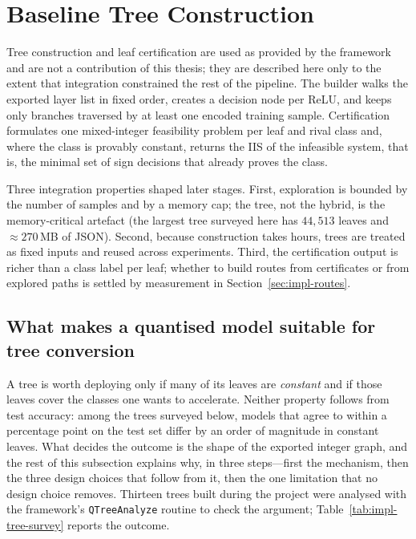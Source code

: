 \section{Baseline Tree Construction}
\label{sec:impl-tree}

Tree construction and leaf certification are used as provided by the framework and are not a contribution of this thesis; they are described here only to the extent that integration constrained the rest of the pipeline.
The builder walks the exported layer list in fixed order, creates a decision node per \ac{ReLU}, and keeps only branches traversed by at least one encoded training sample.
Certification formulates one mixed-integer feasibility problem per leaf and rival class and, where the class is provably constant, returns the \ac{IIS} of the infeasible system, that is, the minimal set of sign decisions that already proves the class.

Three integration properties shaped later stages.
First, exploration is bounded by the number of samples and by a memory cap; the tree, not the hybrid, is the memory-critical artefact (the largest tree surveyed here has $44{,}513$ leaves and ${\approx}270$\,MB of JSON).
Second, because construction takes hours, trees are treated as fixed inputs and reused across experiments.
Third, the certification output is richer than a class label per leaf; whether to build routes from certificates or from explored paths is settled by measurement in Section~\ref{sec:impl-routes}.

\subsection{What makes a quantised model suitable for tree conversion}
\label{sec:impl-tree-survey}

A tree is worth deploying only if many of its leaves are \emph{constant} and if those leaves cover the classes one wants to accelerate.
Neither property follows from test accuracy: among the trees surveyed below, models that agree to within a percentage point on the test set differ by an order of magnitude in constant leaves.
What decides the outcome is the shape of the exported integer graph, and the rest of this subsection explains why, in three steps---first the mechanism, then the three design choices that follow from it, then the one limitation that no design choice removes.
Thirteen trees built during the project were analysed with the framework's \texttt{QTreeAnalyze} routine to check the argument; Table~\ref{tab:impl-tree-survey} reports the outcome.

